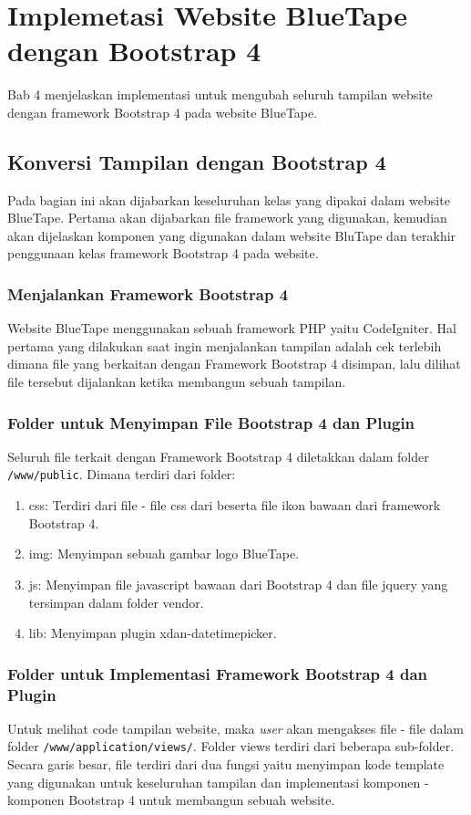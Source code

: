 \chapter{Implemetasi Website BlueTape dengan Bootstrap 4}
Bab 4 menjelaskan implementasi untuk mengubah seluruh tampilan website dengan framework Bootstrap 4 pada website BlueTape.
\section{Konversi Tampilan dengan Bootstrap 4}
Pada bagian ini akan dijabarkan keseluruhan kelas yang dipakai dalam website BlueTape. Pertama akan dijabarkan file framework yang digunakan, kemudian akan dijelaskan komponen yang digunakan dalam website BluTape dan terakhir penggunaan kelas framework Bootstrap 4 pada website.
\subsection{Menjalankan Framework Bootstrap 4}
Website BlueTape menggunakan sebuah framework PHP yaitu CodeIgniter. Hal pertama yang dilakukan saat ingin menjalankan tampilan adalah cek terlebih dimana file yang berkaitan dengan Framework Bootstrap 4 disimpan, lalu dilihat file tersebut dijalankan ketika membangun sebuah tampilan. 
\subsection{Folder untuk Menyimpan File Bootstrap 4 dan Plugin}
Seluruh file terkait dengan Framework Bootstrap 4 diletakkan dalam folder \texttt{/www/public}. Dimana terdiri dari folder:
\begin{enumerate}
	\item css: Terdiri dari file - file css dari beserta file ikon bawaan dari framework Bootstrap 4. 
	\item img: Menyimpan sebuah gambar logo BlueTape. 
	\item js: Menyimpan file javascript bawaan dari Bootstrap 4 dan file jquery yang tersimpan dalam folder vendor.
	\item lib: Menyimpan plugin xdan-datetimepicker.
\end{enumerate}


\subsection{Folder untuk Implementasi Framework Bootstrap 4 dan Plugin}
Untuk melihat code tampilan website, maka \textit{user} akan mengakses file - file dalam folder \texttt{/www/application/views/}. Folder views terdiri dari beberapa sub-folder. Secara garis besar, file terdiri dari dua fungsi yaitu menyimpan kode template yang digunakan untuk keseluruhan tampilan dan implementasi komponen - komponen Bootstrap 4 untuk membangun sebuah website. \\

